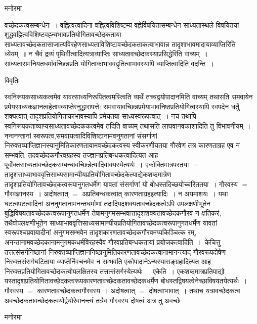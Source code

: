 \documentclass[10pt, openany]{book}
\begin{document}
{\begin{center}   मनोरमा  \end{center}
वच्छेदकत्वसम्बन्धेन~। वह्नित्वत्वादिना वह्नित्वविशिष्टम्य वह्नेर्विषयितासम्बन्धेन साध्यतास्थले विषयितया शुद्धवह्नित्वविशिष्टवह्न्यभावप्रतियोगितावच्छेदकताया
साध्यतावच्छेदकतासाजात्यविरहेणसाध्यताविशिष्टावच्छेदकताकत्वाभावान्न तादृशाभावमादायाव्याप्तिरिति ध्येयम्~॥ न चैवं द्रव्यं पृथिवीत्वादित्यत्राव्याप्तिः साध्यतावच्छेदकस्याप्रसिद्धेरिति वाच्यम्~। साध्यतासमनियतधर्मावच्छिन्नप्रति योगिताकाभाववद्वृतित्वाभावस्यापि व्याप्तित्वादिति वदन्ति~।
\newpage
\lfoot{}
\begin{center}     विवृतिः \end{center}
स्वनिरूपकसाध्यकत्वमेव यावत्साध्यनिरूपितत्वमस्त्विति व्यर्थे तच्चद्वयोपादानमिति वाच्यम्  तथासति समवायेन प्रमेयसाध्यकज्ञानत्वहेतावव्याप्तेरनुद्धारापत्ते:
समवायावच्छिन्नप्रमेयाभावनिष्ठप्रतियोगित्वस्यापि स्वपदेन धर्तेु  शक्यत्वात् तादृशप्रतियोगिताकाभावस्यापि प्रमेयतया साध्यस्वरूपत्वात्~। नच तथापि स्वनिरूपकताव्याप्यसाध्यतावच्छेदककत्वमेव तदिति वाच्यम् तथासति लाघवानवकाशादिति तु विभावनीयम्~। नन्वनन्तानां स्वरूपत्व,समवायत्वादिविशिष्टानामवनुगतानां संसर्गाणां निरुक्तव्याप्तिज्ञानस्यानुमितिकारणतायामवच्छेदकत्वस्य स्वीकरणीयतया गौरवेण तत्र कारणताग्रह एव न सम्भवति, तदवच्छेदकगौरवग्रहस्य तज्ज्ञानप्रतिबन्धकत्वादित्यत आह पूर्वोक्तसाध्यतावच्छेदकसम्बन्धावच्छिन्नेत्यादिवाक्यस्येत्यर्थः~। एकोक्तिमात्रपरतया $=$ तादृशसाध्याभाववृत्तिसाध्यसामान्यीयप्रतियोगितावच्छेदकेत्याद्येकशब्दमात्रेण तादृशप्रतियोगितावच्छेदकत्वरूपानुगतधर्मेण यावतां संसर्गाणां यो बोधस्तदिच्छयोच्चरिततया~।
गौरवस्य $=$ गौरवज्ञानस्य~। अदोषत्वात् $=$ अप्रतिबन्धकत्वात् कारणताग्रहइत्यादिः~। न अयमाशयः~। यथा घटत्वपटत्वादिनां अननुगतानामनन्तधर्माणां तदादिपदशक्यतावच्छेदकत्वेऽपि उपलक्षणीभूतेन बुद्धिविषयतावच्छेदकत्वरूपानुगतधर्मेण तेषामनुगमसम्भवात्तादृशशक्यतावच्छेदकगौरवं न क्षतिकरं, तथैवोपलक्षणीभूतेन
साध्याभाववृत्तिसाध्यसामान्यीयप्रतियोगितावच्छेदकत्वरूपानुगतधर्मेण यावतां स्वरूपश्चप्रवायादीनां अनुगमसम्भवेन तादृशकारणतावच्छेदकगौरवमप्यकिञ्चित्क
रम्, अनन्तानामवच्छेदकानामनुगमकधर्मविरहस्यैव गौरवप्रतिबन्धकतायां प्रयोजकत्वादिति~।~{\la केचित्तु} तत्तत्संसर्गनिष्ठानां निरुक्तव्याप्तिज्ञाननिष्ठानुमितिकारणतावच्छेदकत्वानामानन्त्याद् गौरवरूपदोषेण निरुक्तसंसर्गघटिताया व्याप्तेर्निवचनमेव न सम्भवति एकोपादानेऽन्यस्यासङ्ग्रहादित्यत आह
निरुक्तप्रतियोगितावच्छेदकत्वोपलक्षितस्य तत्तत्संसर्गस्येत्यर्थः~। {\qt
एकेति}~। एकशब्दमात्रप्रतिपाद्यो यस्तादृशप्रतियोगितावच्छेदकत्वरूपकारणतावच्छेदकतावच्छेदकधर्मेण बोधस्तद्विषयत्वेनेच्छाविषयतयेत्यर्थः~। गौरवस्य $=$ कारणतावच्छेदकत्वगौरवस्य~। अदोषत्वात् $=$ दोषत्वाभावात्~। तथाच यत्रावच्छेदकत्व अवच्छेदकतावच्छेदकत्वयोर्द्वयोरेवानन्त्यं तत्रैव गौरवस्य दोषत्वं अत्र तु अवच्छे
\begin{center}   मनोरमा  \end{center}

}
\end{document}
